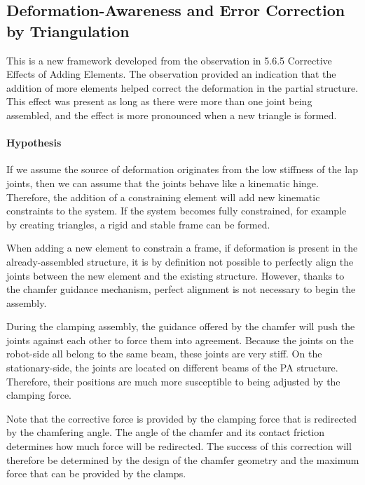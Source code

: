 \subsection{Deformation-Awareness and Error Correction by Triangulation}
\label{subsection:exploration-4-deformation-awareness-and-error-correction-by-triangulation}

This is a new framework developed from the observation in 5.6.5 Corrective Effects of Adding Elements. The observation provided an indication that the addition of more elements helped correct the deformation in the partial structure. This effect was present as long as there were more than one joint being assembled, and the effect is more pronounced when a new triangle is formed. 

\paragraph{Hypothesis}

If we assume the source of deformation originates from the low stiffness of the lap joints, then we can assume that the joints behave like a kinematic hinge. Therefore, the addition of a constraining element will add new kinematic constraints to the system. If the system becomes fully constrained, for example by creating triangles, a rigid and stable frame can be formed.

When adding a new element to constrain a frame, if deformation is present in the already-assembled structure, it is by definition not possible to perfectly align the joints between the new element and the existing structure. However, thanks to the chamfer guidance mechanism, perfect alignment is not necessary to begin the assembly.

During the clamping assembly, the guidance offered by the chamfer will push the joints against each other to force them into agreement. Because the joints on the robot-side all belong to the same beam, these joints are very stiff. On the stationary-side, the joints are located on different beams of the PA structure. Therefore, their positions are much more susceptible to being adjusted by the clamping force. 

Note that the corrective force is provided by the clamping force that is redirected by the chamfering angle. The angle of the chamfer and its contact friction determines how much force will be redirected. The success of this correction will therefore be determined by the design of the chamfer geometry and the maximum force that can be provided by the clamps. 

